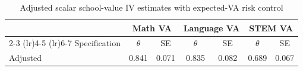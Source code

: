 \begin{table}[!htbp]
\centering
\caption{Adjusted scalar school-value IV estimates with expected-VA risk control}
\label{tab:scalar_school_value_iv_adjusted_expected_va}
\begin{tabular}{lcccccc}
\toprule
 & \multicolumn{2}{c}{Math VA} & \multicolumn{2}{c}{Language VA} & \multicolumn{2}{c}{STEM VA} \\
\cmidrule(lr){2-3} \cmidrule(lr){4-5} \cmidrule(lr){6-7}
Specification & $\theta$ & SE & $\theta$ & SE & $\theta$ & SE \\
\midrule
Adjusted & 0.841 & 0.071 & 0.835 & 0.082 & 0.689 & 0.067 \\
\bottomrule
\end{tabular}
\end{table}
